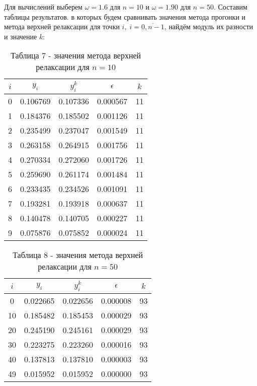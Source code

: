 \documentclass[a4paper,12pt]{article}
\begin{document}
{		Для вычислений выберем $\omega = 1.6$ для $n=10$ и $\omega = 1.90$ для $n=50$. Составим таблицы результатов.
		в которых будем сравнивать значения метода прогонки и метода верхней релаксации для точки $i,\; i = \overline{0, n-1}$,
		найдём модуль их разности и значение $k$:
		\begin{table}[h]
			\centering
			\begin{tabular}{|c|c|c|c|c|}
				\hline
				$i$ & $y_i$ & $y_i^k$ & $\epsilon$ & $k$\\
				\hline
				0 & 0.106769 & 0.107336 & 0.000567 & 11 \\
				\hline
				1 & 0.184376 & 0.185502 & 0.001126 & 11 \\
				\hline
				2 & 0.235499 & 0.237047 & 0.001549 & 11 \\
				\hline
				3 & 0.263158 & 0.264915 & 0.001756 & 11 \\
				\hline
				4 & 0.270334 & 0.272060 & 0.001726 & 11 \\
				\hline
				5 & 0.259690 & 0.261174 & 0.001484 & 11 \\
				\hline
				6 & 0.233435 & 0.234526 & 0.001091 & 11 \\
				\hline
				7 & 0.193281 & 0.193918 & 0.000637 & 11 \\
				\hline
				8 & 0.140478 & 0.140705 & 0.000227 & 11 \\
				\hline
				9 & 0.075876 & 0.075852 & 0.000024 & 11 \\
				\hline
			\end{tabular}
			\caption*{\small{Таблица 7 - значения метода верхней релаксации для $n = 10$}}
		\end{table}
		\begin{table}[h]
			\centering
			\begin{tabular}{|c|c|c|c|c|}
				\hline
				$i$ & $y_i$ & $y_i^k$ & $\epsilon$ & $k$\\
				\hline
				0 & 0.022665 & 0.022656 & 0.000008 & 93 \\
				\hline
				10 & 0.185482 & 0.185453 & 0.000029 & 93 \\
				\hline
				20 & 0.245190 & 0.245161 & 0.000029 & 93 \\
				\hline
				30 & 0.223275 & 0.223260 & 0.000016 & 93 \\
				\hline
				40 & 0.137813 & 0.137810 & 0.000003 & 93 \\
				\hline
				49 & 0.015952 & 0.015952 & 0.000000 & 93 \\
				\hline
			\end{tabular}
			\caption*{\small{Таблица 8 - значения метода верхней релаксации для $n = 50$}}
		\end{table}
		\clearpage
}
\end{document}

